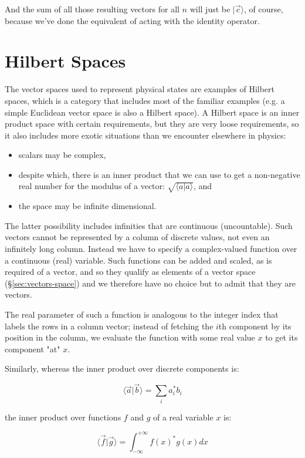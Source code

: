 And the sum of all those resulting vectors for all $n$ will just be $|\vec{c} \rangle$, of course, because we've done the equivalent of acting with the identity operator.

\section{Hilbert Spaces}

The vector spaces used to represent physical states are examples of Hilbert spaces, which is a category that includes most of the familiar examples (e.g. a simple Euclidean vector space is also a Hilbert space). A Hilbert space is an inner product space with certain requirements, but they are very loose requirements, so it also includes more exotic situations than we encounter elsewhere in physics:

\begin{itemize}
  \item scalars may be complex,
  \item despite which, there is an inner product that we can use to get a non-negative real number for the modulus of a vector: $\sqrt{\langle a|a \rangle}$, and 
  \item the space may be infinite dimensional.
\end{itemize}

The latter possibility includes infinities that are continuous (uncountable). Such vectors cannot be represented by a column of discrete values, not even an infinitely long column. Instead we have to specify a complex-valued function over a continuous (real) variable. Such functions can be added and scaled, as is required of a vector, and so they qualify as elements of a vector space (§\ref{sec:vectors-space}) and we therefore have no choice but to admit that they are vectors.

The real parameter of such a function is analogous to the integer index that labels the rows in a column vector; instead of fetching the $i$th component by its position in the column, we evaluate the function with some real value $x$ to get its component "at" $x$.

Similarly, whereas the inner product over discrete components is:

$$
\langle \vec{a} | \vec{b} \rangle
=
\sum_i
a_i^* b_i
$$

the inner product over functions $f$ and $g$ of a real variable $x$ is:

$$
\langle \vec{f} | \vec{g} \rangle
=
\int_{-\infty}^{+\infty}
f(x)^* g(x)
dx
$$

